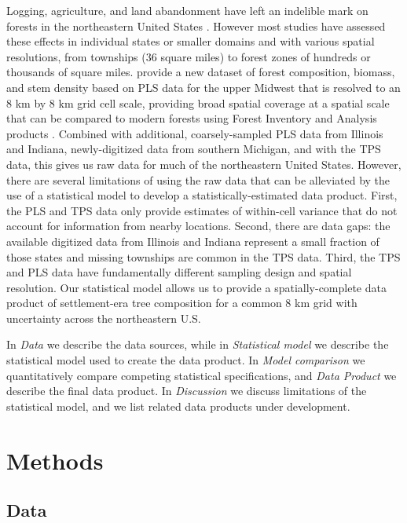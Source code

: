 \documentclass[10pt,letterpaper]{article}
\begin{document}
Logging, agriculture, and land abandonment have left an indelible
mark on forests in the northeastern United States \cite{foster1998land,rhemtulla2009legacies,thompson2013four,goring2015composition}.
However most studies have assessed these effects in individual states
or smaller domains \cite{friedman2005regional,rhemtulla2009historical}
and with various spatial resolutions, from townships (36 square miles)
to forest zones of hundreds or thousands of square miles. \cite{goring2015composition}
provide a new dataset of forest composition, biomass, and stem density
based on PLS data for the upper Midwest that is resolved to an 8 km
by 8 km grid cell scale, providing broad spatial coverage at a spatial
scale that can be compared to modern forests using Forest Inventory
and Analysis products \cite{gray2012forest}. Combined with additional,
coarsely-sampled PLS data from Illinois and Indiana, newly-digitized
data from southern Michigan, and with the TPS data, this gives us
raw data for much of the northeastern United States. However, there
are several limitations of using the raw data that can be alleviated
by the use of a statistical model to develop a statistically-estimated
data product. First, the PLS and TPS data only provide estimates of
within-cell variance that do not account for information from nearby
locations. Second, there are data gaps: the available digitized data
from Illinois and Indiana represent a small fraction of those states
and missing townships are common in the TPS data. Third, the TPS and
PLS data have fundamentally different sampling design and spatial
resolution. Our statistical model allows us to provide a spatially-complete
data product of settlement-era tree composition for a common 8 km
grid with uncertainty across the northeastern U.S.

In \emph{Data} we describe the data sources, while in \emph{Statistical model}
we describe the statistical model used to create the data product.
In \emph{Model comparison} we quantitatively compare competing
statistical specifications, and \emph{Data Product}
we describe the final data product. In \emph{Discussion}
we discuss limitations of the statistical model, and we list related
data products under development.


\section*{Methods}



\subsection*{Data\label{sec:Data}}
\end{document}
